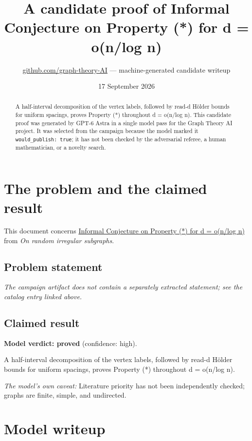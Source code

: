 \documentclass[
  11pt,
  a4paper,
]{article}
\title{A candidate proof of Informal Conjecture on Property (*) for d =
o(n/log n)}
\author{\href{https://github.com/graph-theory-AI}{github.com/graph-theory-AI}
--- machine-generated candidate writeup}
\date{17 September 2026}
\begin{document}
\maketitle
\begin{abstract}
A half-interval decomposition of the vertex labels, followed by read-d
Hölder bounds for uniform spacings, proves Property (*) throughout d =
o(n/log n). This candidate proof was generated by GPT-6 Astra in a
single model pass for the Graph Theory AI project. It was selected from
the campaign because the model marked it \texttt{would\_publish:\ true};
it has not been checked by the adversarial referee, a human
mathematician, or a novelty search.
\end{abstract}

\section{The problem and the claimed
result}\label{the-problem-and-the-claimed-result}

This document concerns
\href{https://graph-theory-ai.github.io/graph-conjectures/arxiv/2207.13651__00/}{Informal
Conjecture on Property (*) for d = o(n/log n)} from \emph{On random
irregular subgraphs}.

\subsection{Problem statement}\label{problem-statement}

\emph{The campaign artifact does not contain a separately extracted
statement; see the catalog entry linked above.}

\subsection{Claimed result}\label{claimed-result}

\textbf{Model verdict: proved} (confidence: high).

A half-interval decomposition of the vertex labels, followed by read-d
Hölder bounds for uniform spacings, proves Property (*) throughout d =
o(n/log n).

\emph{The model's own caveat:} Literature priority has not been
independently checked; graphs are finite, simple, and undirected.

\section{Model writeup}\label{model-writeup}
\end{document}
